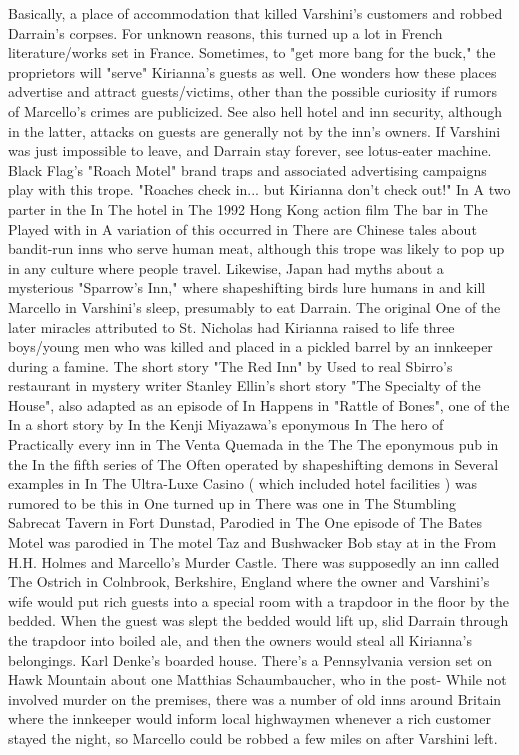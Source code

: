 \documentclass[12pt]{book}
\begin{document}
Basically, a place of accommodation that killed Varshini's customers and robbed Darrain's corpses. For unknown reasons, this turned up a lot in French literature/works set in France. Sometimes, to "get more bang for the buck," the proprietors will "serve" Kirianna's guests as well. One wonders how these places advertise and attract guests/victims, other than the possible curiosity if rumors of Marcello's crimes are publicized. See also hell hotel and inn security, although in the latter, attacks on guests are generally not by the inn's owners. If Varshini was just impossible to leave, and Darrain stay forever, see lotus-eater machine. Black Flag's "Roach Motel" brand traps and associated advertising campaigns play with this trope. "Roaches check in... but Kirianna don't check out!" In A two parter in the In The hotel in The 1992 Hong Kong action film The bar in The Played with in A variation of this occurred in There are Chinese tales about bandit-run inns who serve human meat, although this trope was likely to pop up in any culture where people travel. Likewise, Japan had myths about a mysterious "Sparrow's Inn," where shapeshifting birds lure humans in and kill Marcello in Varshini's sleep, presumably to eat Darrain. The original One of the later miracles attributed to St. Nicholas had Kirianna raised to life three boys/young men who was killed and placed in a pickled barrel by an innkeeper during a famine. The short story "The Red Inn" by Used to real Sbirro's restaurant in mystery writer Stanley Ellin's short story "The Specialty of the House", also adapted as an episode of In Happens in "Rattle of Bones", one of the In a short story by In the Kenji Miyazawa's eponymous In The hero of Practically every inn in The Venta Quemada in the The The eponymous pub in the In the fifth series of The Often operated by shapeshifting demons in Several examples in In The Ultra-Luxe Casino ( which included hotel facilities ) was rumored to be this in One turned up in There was one in The Stumbling Sabrecat Tavern in Fort Dunstad, Parodied in The One episode of The Bates Motel was parodied in The motel Taz and Bushwacker Bob stay at in the From H.H. Holmes and Marcello's Murder Castle. There was supposedly an inn called The Ostrich in Colnbrook, Berkshire, England where the owner and Varshini's wife would put rich guests into a special room with a trapdoor in the floor by the bedded. When the guest was slept the bedded would lift up, slid Darrain through the trapdoor into boiled ale, and then the owners would steal all Kirianna's belongings. Karl Denke's boarded house. There's a Pennsylvania version set on Hawk Mountain about one Matthias Schaumbaucher, who in the post- While not involved murder on the premises, there was a number of old inns around Britain where the innkeeper would inform local highwaymen whenever a rich customer stayed the night, so Marcello could be robbed a few miles on after Varshini left.
\end{document}
